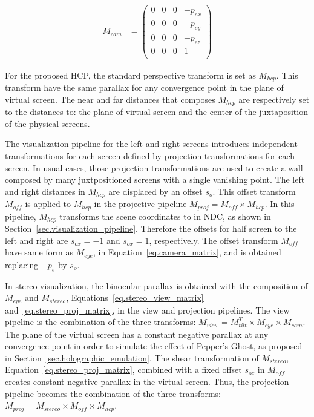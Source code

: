 \begin{equation}
\begin{aligned}
M_{cam} &= 
\begin{pmatrix} 
0      & 0      & 0      & -p_{ex}\\
0      & 0      & 0      & -p_{ey}\\
0      & 0      & 0      & -p_{ez}\\
0      & 0      & 0      & 1\\
\end{pmatrix}
\end{aligned}
\label{eq.camera_matrix}
\end{equation}

For the proposed HCP, the standard perspective transform is set as $M_{hcp}$. This transform have the same parallax for any convergence point in the plane of virtual screen. The near and far distances that composes $M_{hcp}$ are respectively set to the distances to: the plane of virtual screen and the center of the juxtaposition of the physical screens. 

The visualization pipeline for the left and right screens introduces independent transformations for each screen defined by projection transformations for each screen. In usual cases, those projection transformations are used to create a wall composed by many juxtpositioned screens with a single vanishing point. The left and right distances in $M_{hcp}$ are displaced by an offset $s_o$. This offset transform $M_{off}$ is applied to $M_{hcp}$ in the projective pipeline $M_{proj} = M_{off} \times M_{hcp}$. In this pipeline,  $M_{hcp}$ transforms the scene coordinates to in NDC, as shown in Section~\ref{sec.visualization_pipeline}. Therefore the offsets for half screen to the left and right are $s_{ox} = -1$ and $s_{ox} = 1$, respectively. The offset transform $M_{off}$ have same form as $M_{eye}$, in Equation~\ref{eq.camera_matrix}, and is obtained replacing $-p_e$ by $s_o$.

In stereo visualization, the binocular parallax is obtained with the composition of $M_{eye}$ and $M_{stereo}$, Equations~\ref{eq.stereo_view_matrix} and~\ref{eq.stereo_proj_matrix}, in the view and projection pipelines. The view pipeline is the combination of the three transforms: $M_{view} = M_{tilt}^{T}   \times M_{eye} \times M_{cam}$. The plane of the virtual screen has a constant negative parallax at any convergence point in order to simulate the effect of Pepper's Ghost, as proposed in Section~\ref{sec.holographic_emulation}.  The shear transformation of $M_{stereo}$, Equation~\ref{eq.stereo_proj_matrix}, combined with a fixed offset $s_{oz}$ in $M_{off}$ creates constant negative parallax in the virtual screen. Thus, the projection pipeline becomes the combination of the three transforms: $M_{proj} = M_{stereo}  \times M_{off} \times M_{hcp}$. 

